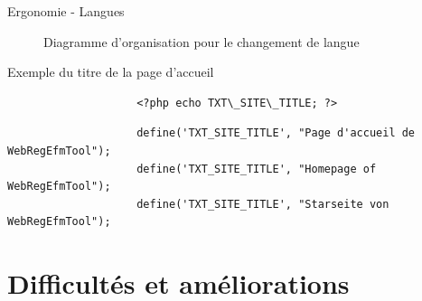 \documentclass{beamer}
\begin{document}
\begin{frame}[fragile]{\textcolor{bleu2}{\hspace{1cm} Ergonomie - Langues}}
	\begin{figure}
		\begin{center}
			\caption{Diagramme d'organisation pour le changement de langue}
		\end{center}
	\end{figure}
	\begin{block}{\hspace{0.2cm}Exemple du titre de la page d'accueil}
		\begin{center}
			\begin{minipage}[c]{0.9\textwidth}
				\begin{verbatim}
					<?php echo TXT\_SITE\_TITLE; ?>
				\end{verbatim}
				\scriptsize
				\begin{verbatim}
					define('TXT_SITE_TITLE', "Page d'accueil de WebRegEfmTool");
					define('TXT_SITE_TITLE', "Homepage of WebRegEfmTool");
					define('TXT_SITE_TITLE', "Starseite von WebRegEfmTool");
				\end{verbatim}
			\end{minipage}
		\end{center}
	\end{block}
\end{frame}

\section{Difficultés et améliorations}
\end{document}

